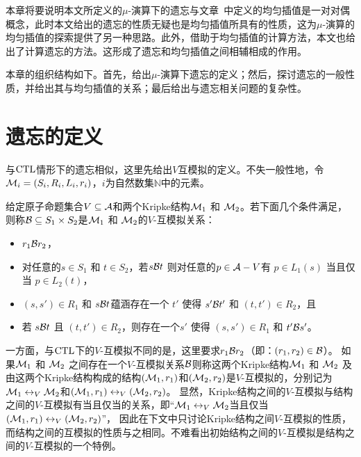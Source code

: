 本章将要说明本文所定义的$\mu$-演算下的遗忘与文章~\cite{d2006modal}中定义的均匀插值是一对对偶概念，此时本文给出的遗忘的性质无疑也是均匀插值所具有的性质，这为$\mu$-演算的均匀插值的探索提供了另一种思路。此外，借助于均匀插值的计算方法，本文也给出了计算遗忘的方法。这形成了遗忘和均匀插值之间相辅相成的作用。

本章的组织结构如下。首先，给出$\mu$-演算下遗忘的定义；然后，探讨遗忘的一般性质，并给出其与均匀插值的关系；最后给出与遗忘相关问题的复杂性。

\section{遗忘的定义}\label{sec:chapter06-system-model}
与$\textrm{CTL}$情形下的遗忘相似，这里先给出$V$互模拟的定义。不失一般性地，令${\cal M}_i = (S_i, R_i, L_i, r_i)$，$i$为自然数集$\mathbb{N}$中的元素。
\begin{definition}[$V$-互模拟]\label{def:VB}
	给定原子命题集合$V \subseteq {\cal A}$和两个Kripke结构${\cal M}_1$ 和 ${\cal M}_2$。若下面几个条件满足，则称${\cal B}\subseteq S_1 \times S_2$是${\cal M}_1$ 和 ${\cal M}_2$的$V$-互模拟关系：
	\begin{itemize}
		\item $r_1 {\cal B} r_2$，
		\item 对任意的$s\in S_1$ 和 $t\in S_2$，若$s {\cal B} t$ 则对任意的$p \in {\cal A}- V$有 $p \in L_1(s)$ 当且仅当 $p \in L_2(t)$，
		\item $(s, s')\in R_1$ 和 $s {\cal B} t$蕴涵存在一个 $t'$ 使得 $s' {\cal B} t'$ 和 $(t, t')\in R_2$，且
		\item 若 $s {\cal B} t$ 且 $(t, t')\in R_2$，则存在一个$s'$ 使得 $(s, s')\in R_1$ 和 $t' {\cal B} s'$。
	\end{itemize}
\end{definition}

一方面，与$\textrm{CTL}$下的$V$-互模拟不同的是，这里要求$r_1 {\cal B} r_2$（即：$(r_1,r_2)\in {\cal B}$）。
如果${\cal M}_1$ 和 ${\cal M}_2$ 之间存在一个$V$-互模拟关系${\cal B}$则称这两个Kripke结构${\cal M}_1$ 和 ${\cal M}_2$ 及由这两个Kripke结构构成的结构$({\cal M}_1,r_1)$和$({\cal M}_2,r_2)$是$V$-互模拟的，分别记为${\cal M}_1 \leftrightarrow_V {\cal M}_2$和$({\cal M}_1,r_1) \leftrightarrow_V ({\cal M}_2,r_2)$。
显然，Kripke结构之间的$V$-互模拟与结构之间的$V$-互模拟有当且仅当的关系，即“${\cal M}_1 \leftrightarrow_V {\cal M}_2$当且仅当$({\cal M}_1,r_1) \leftrightarrow_V ({\cal M}_2,r_2)$”， 因此在下文中只讨论Kripke结构之间$V$-互模拟的性质，而结构之间的互模拟的性质与之相同。不难看出初始结构之间的$V$-互模拟是结构之间的$V$-互模拟的一个特例。


